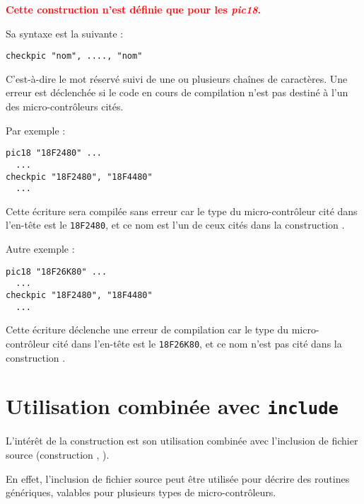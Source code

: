
\cleardoublepage


\thispagestyle{empty}

\textcolor{red}{\bf Cette construction n'est définie que pour les \emph{pic18}.}

Sa syntaxe est la suivante :

\begin{lstlisting}[language=piccolo]
checkpic "nom", ...., "nom"
\end{lstlisting}

C'est-à-dire le mot réservé  suivi de une ou plusieurs chaînes de caractères. Une erreur est déclenchée si le code en cours de compilation n'est pas destiné à l'un des micro-contrôleurs cités.

Par exemple :

\begin{lstlisting}[language=piccolo]
pic18 "18F2480" ...
  ...
checkpic "18F2480", "18F4480"
  ...
\end{lstlisting}

Cette écriture sera compilée sans erreur car le type du micro-contrôleur cité dans l'en-tête est le \texttt{18F2480}, et ce nom est l'un de ceux cités dans la construction .

Autre exemple :

\begin{lstlisting}[language=piccolo]
pic18 "18F26K80" ...
  ...
checkpic "18F2480", "18F4480"
  ...
\end{lstlisting}

Cette écriture déclenche une erreur de compilation car le type du micro-contrôleur cité dans l'en-tête est le \texttt{18F26K80}, et ce nom n'est pas cité dans la construction .




\section{Utilisation combinée avec \texttt{include}}
L'intérêt de la construction  est son utilisation combinée avec l'inclusion de fichier source (construction , ).

En effet, l'inclusion de fichier source peut être utilisée pour décrire des routines génériques, valables pour plusieurs types de micro-contrôleurs.

